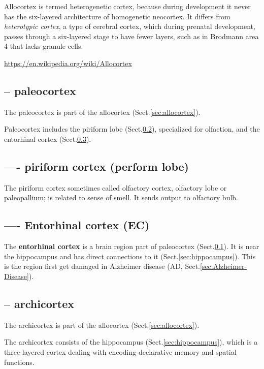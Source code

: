 Allocortex is termed heterogenetic cortex, because during development it never
has the six-layered architecture of homogenetic neocortex.
It differs from {\it heterotypic cortex}, a type of cerebral cortex, which
during prenatal development, passes through a six-layered stage to have fewer
layers, such as in Brodmann area 4 that lacks granule cells.

\url{https://en.wikipedia.org/wiki/Allocortex}

\subsection{-- paleocortex}
\label{sec:paleocortex}

The paleocortex is part of the allocortex (Sect.\ref{sec:allocortex}). 

Paleocortex includes the piriform lobe (Sect.\ref{sec:piriform-cortex}),
specialized for olfaction, and the entorhinal cortex
(Sect.\ref{sec:entorhinal-cortex}).

\subsection{---- piriform cortex (perform lobe)}
\label{sec:piriform-cortex}

The piriform cortex sometimes called  olfactory cortex, olfactory lobe or
paleopallium; is related to sense of smell. It sends output to olfactory bulb.

\subsection{---- Entorhinal cortex (EC)}
\label{sec:entorhinal-cortex}

The {\bf entorhinal cortex} is a brain region part of paleocortex
(Sect.\ref{sec:paleocortex}). It is near the hippocampus and has direct
connections to it (Sect.\ref{sec:hippocampus}). This is the region first get
damaged in Alzheimer disease (AD, Sect.\ref{sec:Alzheimer-Disease}).

\subsection{-- archicortex}
\label{sec:archicortex}

The archicortex is part of the allocortex (Sect.\ref{sec:allocortex}).

The archicortex consists of the hippocampus (Sect.\ref{sec:hippocampus}), which
is a three-layered cortex dealing with encoding declarative memory and spatial
functions.


